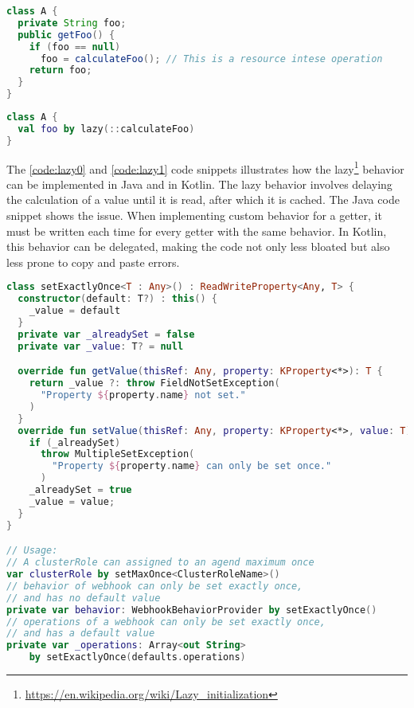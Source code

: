 \begin{minipage}{\linewidth}
\begin{lstlisting}[caption={Lazy getter in Java},language=Java,label=code:lazy0]
class A {
  private String foo;
  public getFoo() {
    if (foo == null) 
      foo = calculateFoo(); // This is a resource intese operation
    return foo;
  }
}
\end{lstlisting}    
\end{minipage}

\begin{minipage}{\linewidth}
\begin{lstlisting}[caption={Lazy property in Kotlin},language=Kotlin,label=code:lazy1]
class A {
  val foo by lazy(::calculateFoo)
}
\end{lstlisting}
\end{minipage}

The \ref{code:lazy0} and \ref{code:lazy1} code snippets illustrates how the lazy\footnote{\url{https://en.wikipedia.org/wiki/Lazy_initialization}} behavior can be implemented in Java and in Kotlin. The lazy behavior involves delaying the calculation of a value until it is read, after which it is cached. The Java code snippet shows the issue. When implementing custom behavior for a getter, it must be written each time for every getter with the same behavior. In Kotlin, this behavior can be delegated, making the code not only less bloated but also less prone to copy and paste errors.

\begin{lstlisting}[caption={setExactlyOnce implementation},language=Kotlin,label=code:setonce]
class setExactlyOnce<T : Any>() : ReadWriteProperty<Any, T> {
  constructor(default: T?) : this() {
    _value = default
  }
  private var _alreadySet = false
  private var _value: T? = null

  override fun getValue(thisRef: Any, property: KProperty<*>): T {
    return _value ?: throw FieldNotSetException(
      "Property ${property.name} not set."
    )
  }
  override fun setValue(thisRef: Any, property: KProperty<*>, value: T) {
    if (_alreadySet)
      throw MultipleSetException(
        "Property ${property.name} can only be set once."
      )
    _alreadySet = true
    _value = value;
  }
}

// Usage:
// A clusterRole can assigned to an agend maximum once
var clusterRole by setMaxOnce<ClusterRoleName>()
// behavior of webhook can only be set exactly once,
// and has no default value
private var behavior: WebhookBehaviorProvider by setExactlyOnce()
// operations of a webhook can only be set exactly once,
// and has a default value
private var _operations: Array<out String>
    by setExactlyOnce(defaults.operations)
\end{lstlisting}


